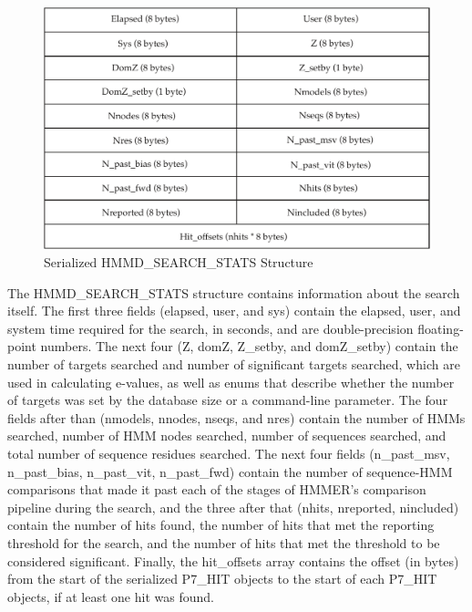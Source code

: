 \documentclass[notoc,justified,openany]{tufte-book}    %
\begin{document}
\begin{figure}
  \includegraphics[width=\textwidth]{inclusions/HMMD_SEARCH_STATS.pdf}
  \caption{Serialized {HMMD\_SEARCH\_STATS} Structure}
  \label{fig:search-stats-serialize}
  \end{figure} 

The {HMMD\_SEARCH\_STATS} structure contains information about the search itself.  The first three fields (elapsed, user, and sys) contain the elapsed, user, and system time required for the search, in seconds, and are double-precision floating-point numbers.  The next four ({Z}, dom{Z}, {Z}\_setby, and dom{Z}\_setby) contain the number of targets searched and number of significant targets searched, which are used in calculating e-values, as well as enums that describe whether the number of targets was set by the database size or a command-line parameter. The four fields after than (nmodels, nnodes, nseqs, and nres) contain the number of HMMs searched, number of HMM nodes searched, number of sequences searched, and total number of sequence residues searched.  The next four fields (n\_past\_msv, n\_past\_bias, n\_past\_vit, n\_past\_fwd) contain the number of sequence-HMM comparisons that made it past each of the stages of HMMER's comparison pipeline during the search, and the three after that (nhits, nreported, nincluded) contain the number of hits found, the number of hits that met the reporting threshold for the search, and the number of hits that met the threshold to be considered significant.  Finally, the hit\_offsets array contains the offset (in bytes) from the start of the serialized {P7\_HIT} objects to the start of each {P7\_HIT} objects, if at least one hit was found.
\end{document}
